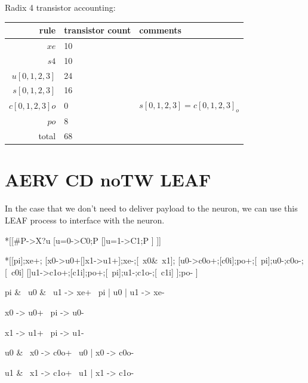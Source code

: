 \documentclass{article}
\begin{document}
\noindent
Radix 4 transistor accounting:

\begin{center}
    \begin{tabular}{|r|l|l|}
    \hline
    rule & transistor count & comments \\ \hline
    $xe$ & 10 & \\ \hline
    $s4$ & 10 & \\ \hline
    $u[0,1,2,3]$ & 24 & \\ \hline
    $s[0,1,2,3]$ & 16 & \\ \hline
    $c[0,1,2,3]o$ & 0 & $s[0,1,2,3]=c[0,1,2,3]_o$ \\ \hline
    $po$ & 8 & \\ \hline
    \hline total & 68 & \\ \hline
    \end{tabular}
\end{center}

\section{AERV CD noTW LEAF \label{sec:AERV_CD_noTW_LEAF}}

In the case that we don't need to deliver payload to the neuron, we can use this LEAF process to interface with the neuron.

\begin{csp}
*[[#{P}->X?u
    [u=0->C0;P
    []u=1->C1;P
    ]
 ]]
\end{csp}

\begin{hse}
*[[pi];xe+;
  [x0->u0+[]x1->u1+];xe-;[~x0&~x1];
  [u0->c0o+;[c0i];po+;[~pi];u0-;c0o-;[~c0i]
  []u1->c1o+;[c1i];po+;[~pi];u1-;c1o-;[~c1i]
  ];po-
 ]
\end{hse}

\begin{prs2}
pi & ~u0 & ~u1 -> xe+
~pi | u0 | u1 -> xe-
\end{prs2}

\begin{prs2}
x0 -> u0+
~pi -> u0-

x1 -> u1+
~pi -> u1-
\end{prs2}

\begin{prs2}
u0 & ~x0 -> c0o+
~u0 | x0 -> c0o-

u1 & ~x1 -> c1o+
~u1 | x1 -> c1o-
\end{prs2}
\end{document}
